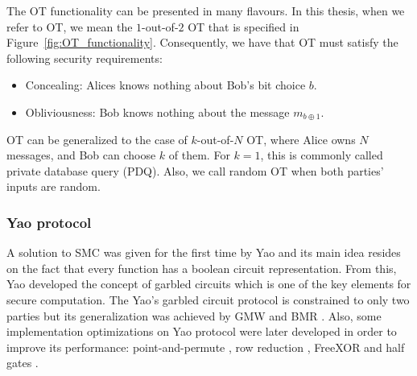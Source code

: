 The OT functionality can be presented in many flavours. In this thesis, when we refer to OT, we mean the $1$-out-of-$2$ OT that is specified in Figure~\ref{fig:OT_functionality}. Consequently, we have that OT must satisfy the following security requirements:

\begin{itemize}
	\item Concealing: Alices knows nothing about Bob's bit choice $b$.
	\item Obliviousness: Bob knows nothing about the message $m_{b\oplus 1}$.
\end{itemize}

OT can be generalized to the case of $k$-out-of-$N$ OT, where Alice owns $N$ messages, and Bob can choose $k$ of them. For $k=1$, this is commonly called private database query (PDQ). Also, we call random OT when both parties' inputs are random.


\subsubsection{Yao protocol}\label{yaoProtocol}

A solution to SMC was given for the first time by Yao \cite{Yao82} and its main idea resides on the fact that every function has a boolean circuit representation. From this, Yao developed the concept of garbled circuits which is one of the key elements for secure computation. The Yao's garbled circuit protocol is constrained to only two parties but its generalization was achieved by GMW \cite{Goldreich87} and BMR \cite{BMR90}. Also, some implementation optimizations on Yao protocol were later developed in order to improve its performance: point-and-permute \cite{BMR90}, row reduction \cite{NPS99, Pinkas2009}, FreeXOR \cite{Kolesnikov2005} and half gates \cite{Zahur2015}. 

